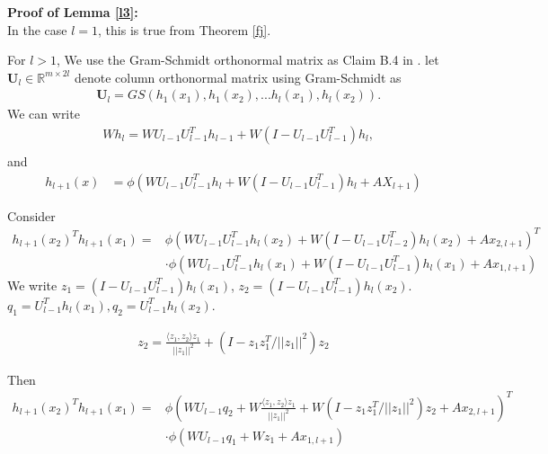 \documentclass{article}
\begin{document}
{\bf Proof of Lemma \ref{l3}:}\\
In the case $l=1$, this is true from Theorem \ref{fj}.

For $l>1$, We use the Gram-Schmidt orthonormal matrix as  Claim B.4 in \cite{rate}. let $\bm{U}_l\in \mathbb{R}^{m\times 2l}$ denote column orthonormal matrix using Gram-Schmidt as
\begin{equation}
\begin{aligned}
&\bm{U}_l=GS(h_1(x_1),h_1(x_2),...h_l(x_1),h_l(x_2)).
\end{aligned}
\end{equation}
We can write
\begin{equation}
\begin{aligned}
&Wh_{l}=WU_{l-1}U_{l-1}^Th_{l-1}+W(I-U_{l-1}U_{l-1}^T)h_l,\\
\end{aligned}
\end{equation}
and
\begin{equation}
\begin{aligned}
h_{l+1}(x)&=\phi(WU_{l-1}U_{l-1}^Th_l+W(I-U_{l-1}U_{l-1}^T)h_l+AX_{l+1})
\end{aligned}
\end{equation}

Consider
\begin{equation}
\begin{aligned}
h_{l+1}(x_2)^Th_{l+1}(x_1)=&\phi(WU_{l-1}U_{l-1}^Th_l(x_2)+W(I-U_{l-1}U_{l-2}^T)h_l(x_2)+Ax_{2,l+1})^T\\
&\cdot\phi(WU_{l-1}U_{l-1}^Th_l(x_1)+W(I-U_{l-1}U_{l-1}^T)h_l(x_1)+Ax_{1,l+1})
\end{aligned}
\end{equation}
We write $z_1=(I-U_{l-1}U_{l-1}^T)h_l(x_1)$, $z_2=(I-U_{l-1}U_{l-1}^T)h_l(x_2).$ $q_1=U_{l-1}^Th_l(x_1), q_2=U_{l-1}^Th_l(x_2)$.

\begin{equation}
\begin{aligned}
z_2=\frac{\langle z_1,z_2\rangle z_1}{||z_1||^2}+(I-z_1z_1^T/||z_1||^2)z_2
\end{aligned}
\end{equation}

Then
\begin{equation}
\begin{aligned}
h_{l+1}(x_2)^Th_{l+1}(x_1)=&\phi(WU_{l-1}q_2+W\frac{\langle z_1,z_2\rangle z_1}{||z_1||^2}+W(I-z_1z_1^T/||z_1||^2)z_2+Ax_{2,l+1})^T\\
&\cdot\phi(WU_{l-1}q_1+Wz_1+Ax_{1,l+1})
\end{aligned}
\end{equation}
\end{document}
